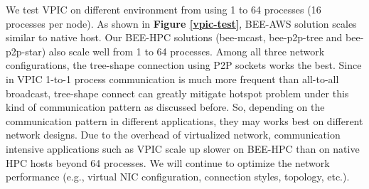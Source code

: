We test VPIC on different environment from using 1 to 64 processes (16 processes per node). As shown in \textbf{Figure \ref{vpic-test}}, BEE-AWS solution scales similar to native host.  Our BEE-HPC solutions (bee-mcast, bee-p2p-tree and bee-p2p-star) also scale well from 1 to 64 processes. Among all three network configurations, the tree-shape connection using P2P sockets works the best. Since in VPIC 1-to-1 process communication is much more frequent than all-to-all broadcast, tree-shape connect can greatly mitigate hotspot problem under this kind of communication pattern as discussed before. So, depending on the communication pattern in different applications, they may works best on different network designs. Due to the overhead of virtualized network, communication intensive applications such as VPIC scale up slower on BEE-HPC than on native HPC hosts beyond 64 processes. We will continue to optimize the network performance (e.g., virtual NIC configuration, connection styles, topology, etc.).
